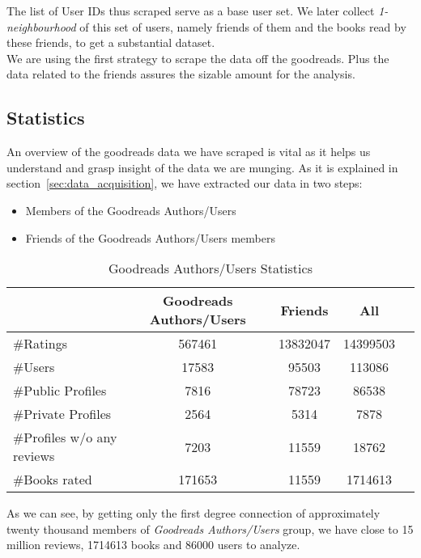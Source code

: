 \documentclass[11pt]{article}
\begin{document}
The list of User IDs thus scraped serve as a base user set. We later collect {\it 1-neighbourhood} of this set of users, namely friends of them and the books read by these friends, to get a substantial dataset.\\
We are using the first strategy to scrape the data off the goodreads. Plus the data related to the friends assures the sizable amount for the analysis.

\subsection{Statistics}

An overview of the goodreads data we have scraped is vital as it helps us understand and grasp insight of the data we are munging.
As it is explained in section~\ref{sec:data_acquisition}, we have extracted our data in two steps:
\begin{itemize}
\item Members of the Goodreads Authors/Users
\item Friends of the Goodreads Authors/Users members
\end{itemize}

\begin{table}[ht]
\begin{center}
\begin{tabular}{lcccc}
\hline
                           &  Goodreads Authors/Users    &   Friends                &   All        \\ \hline
\#Ratings                  &  567461                     &   13832047               &   14399503  \\ \hline
\#Users                    &  17583                      &   95503                  &   113086     \\ \hline
\#Public Profiles          &  7816                       &   78723                  &   86538     \\ \hline
\#Private Profiles         &  2564                       &   5314                   &   7878      \\ \hline
\#Profiles w/o any reviews &  7203                       &   11559                  &   18762      \\ \hline
\#Books rated              &  171653                     &   11559                  &   1714613      \\ \hline
\end{tabular}
\end{center}
\caption{Goodreads Authors/Users Statistics} \label{table:crawl_stat}
\end{table}
As we can see, by getting only the first degree connection of approximately twenty thousand members of {\it Goodreads Authors/Users} group, we have close to 15 million reviews, 1714613 books and 86000 users to analyze.
\end{document}
